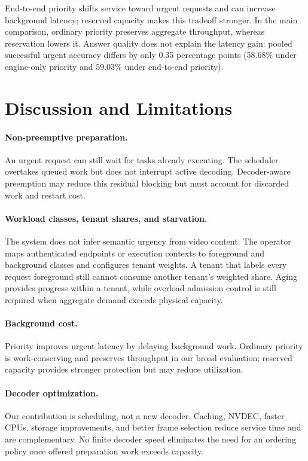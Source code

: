 \documentclass[sigconf,review,anonymous]{acmart}
\begin{document}
End-to-end priority shifts service toward urgent requests and can increase
background latency; reserved capacity makes this tradeoff stronger. In the
main comparison, ordinary priority preserves aggregate throughput, whereas
reservation lowers it. Answer quality does not explain the latency gain:
pooled successful urgent accuracy differs by only 0.35 percentage points
(58.68\% under engine-only priority and 59.03\% under end-to-end priority).

\section{Discussion and Limitations}
\label{sec:discussion}

\paragraph{Non-preemptive preparation.}
An urgent request can still wait for tasks already executing. The scheduler
overtakes queued work but does not interrupt active decoding. Decoder-aware
preemption may reduce this residual blocking but must account for discarded
work and restart cost.

\paragraph{Workload classes, tenant shares, and starvation.}
The system does not infer semantic urgency from video content. The operator
maps authenticated endpoints or execution contexts to foreground and
background classes and configures tenant weights. A tenant that labels every
request foreground still cannot consume another tenant's weighted share.
Aging provides progress within a tenant, while overload admission control is
still required when aggregate demand exceeds physical capacity.

\paragraph{Background cost.}
Priority improves urgent latency by delaying background work. Ordinary
priority is work-conserving and preserves throughput in our broad evaluation;
reserved capacity provides stronger protection but may reduce utilization.

\paragraph{Decoder optimization.}
Our contribution is scheduling, not a new decoder. Caching, NVDEC, faster
CPUs, storage improvements, and better frame selection reduce service time
and are complementary. No finite decoder speed eliminates the need for an
ordering policy once offered preparation work exceeds capacity.
\end{document}
